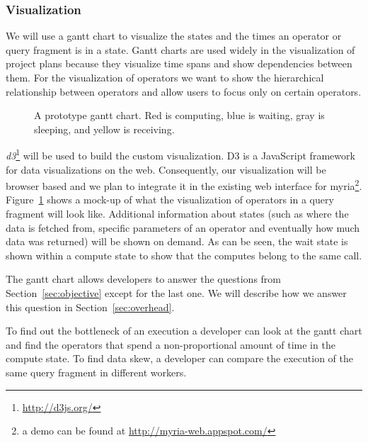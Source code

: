 \documentclass[11pt]{article}
\begin{document}

	\subsubsection{Visualization}

	We will use a gantt chart to visualize the states and the times an operator or query fragment is in a state. Gantt charts are used widely in the visualization of project plans because they visualize time spans and show dependencies between them. For the visualization of operators we want to show the hierarchical relationship between operators and allow users to focus only on certain operators.

\begin{figure}[h]
  \begin{center}
    \def\svgwidth{0.9\columnwidth}
    
  \end{center}
  \caption{A prototype gantt chart. Red is computing, blue is waiting, gray is sleeping, and yellow is receiving.}
  \label{fig:gantt}
\end{figure}

	\emph{d3}\footnote{\url{http://d3js.org/}} will be used to build the custom visualization. D3 is a JavaScript framework for data visualizations on the web. Consequently, our visualization will be browser based and we plan to integrate it in the existing web interface for myria\footnote{a demo can be found at \url{http://myria-web.appspot.com/}}. Figure~\ref{fig:gantt} shows a mock-up of what the visualization of operators in a query fragment will look like. Additional information about states (such as where the data is fetched from, specific parameters of an operator and eventually how much data was returned) will be shown on demand. As can be seen, the wait state is shown within a compute state to show that the computes belong to the same call.

	The gantt chart allows developers to answer the questions from Section~\ref{sec:objective} except for the last one. We will describe how we answer this question in Section~\ref{sec:overhead}.

	To find out the bottleneck of an execution a developer can look at the gantt chart and find the operators that spend a non-proportional amount of time in the compute state. To find data skew, a developer can compare the execution of the same query fragment in different workers.
\end{document}

